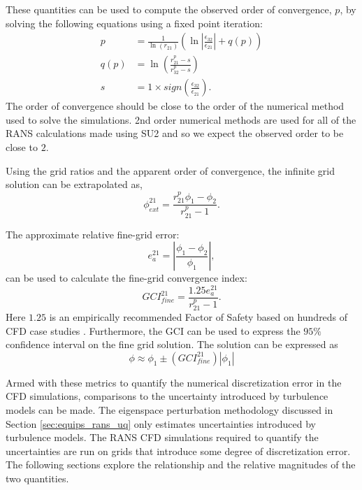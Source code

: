 These quantities can be used to compute the observed order of convergence, $p$, by solving the following equations using a fixed point iteration:
\begin{align}
    p & = \frac{1}{\ln{\left ( r_{21} \right )}} \left ( \ln{\left \vert \frac{\epsilon_{32}}{\epsilon_{21}} \right \vert } + q(p) \right )
    \\
    q(p) & = \ln{ \left ( \frac{r_{21}^{p} - s }{r_{32}^{p} - s}\right )}
    \\
    s & = 1\times sign \left ( \frac{\epsilon_{32}}{\epsilon_{21}}\right ).
\end{align}
The order of convergence should be close to the order of the numerical method used to solve the simulations. 
2nd order numerical methods are used for all of the RANS calculations made using SU2 and so we expect the observed order to be close to $2$.

Using the grid ratios and the apparent order of convergence, the infinite grid solution can be extrapolated as,
\begin{equation}
    \phi_{ext}^{21} = \frac{r_{21}^p\phi_1 - \phi_2}{r_{21}^p - 1}.
\end{equation}

The approximate relative fine-grid error: 
\begin{equation}
    e_a^{21} = \left \vert \frac{\phi_1 - \phi_2}{\phi_1} \right \vert,
\end{equation}
can be used to calculate the fine-grid convergence index:
\begin{equation}
    GCI_{fine}^{21} = \frac{1.25e_a^{21}}{r^p_{21}-1}.
\end{equation}
Here $1.25$ is an empirically recommended Factor of Safety based on hundreds of CFD case studies \cite{roache1998verification}.
Furthermore, the GCI can be used to express the $95\%$ confidence interval on the fine grid solution. 
The solution can be expressed as
\begin{equation} \label{equ:num_error_bars}
    \phi \approx \phi_1 \pm \left( GCI_{fine}^{21} \right)\left \vert \phi_1 \right \vert 
\end{equation}

Armed with these metrics to quantify the numerical discretization error in the CFD simulations, comparisons to the uncertainty introduced by turbulence models can be made. 
The eigenspace perturbation methodology discussed in Section \ref{sec:equips_rans_uq} only estimates uncertainties introduced by turbulence models.
The RANS CFD simulations required to quantify the uncertainties are run on grids that introduce some degree of discretization error.
The following sections explore the relationship and the relative magnitudes of the two quantities.

